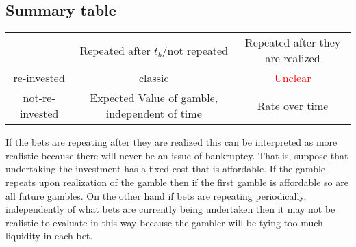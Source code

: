 \documentclass{article}
\begin{document}
\subsection{Summary table}

\begin{center}
\begin{tabular}{ |c|c|c| } 
 \hline
  & Repeated after $t_b$/not repeated & Repeated after they are realized \\ 
 re-invested & classic
 & \textcolor{red}{Unclear} \\ 
 not-re-invested & Expected Value of gamble, independent of time & Rate over time \\ 
 \hline
\end{tabular}
\end{center}

If the bets are repeating after they are realized this can be interpreted as more realistic because there will never be an issue of bankruptcy. That is, suppose that undertaking the investment has a fixed cost that is affordable. If the gamble repeats upon realization of the gamble then if the first gamble is affordable so are all future gambles. On the other hand if bets are repeating periodically, independently of what bets are currently being undertaken then it may not be realistic to evaluate in this way because the gambler will be tying too much liquidity in each bet. 
\end{document}
